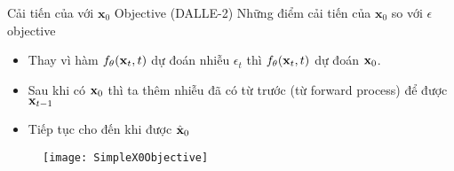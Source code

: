 %
%

\begin{frame}{Cải tiến của  với $\mathbf{x}_0$ Objective (DALLE-2)}
	Những điểm cải tiến của $\mathbf{x}_0$ so với $\epsilon$ objective
	\begin{itemize}
		\item Thay vì hàm $f_{\theta}(\mathbf{x}_t, t)$ dự đoán nhiễu $\epsilon_t$ thì  $f_{\theta}(\mathbf{x}_t, t)$ dự đoán $\mathbf{x}_0$.
		\item Sau khi có $\mathbf{x}_0$ thì ta thêm nhiễu đã có từ trước (từ forward process) để được $\mathbf{x}_{t-1}$
		\item Tiếp tục cho đến khi được $\hat{\mathbf{x}}_0$
		
	\end{itemize} 
	
	\begin{figure}
		\centering
		\texttt{[image: SimpleX0Objective]}
	\end{figure}
	
\end{frame}

